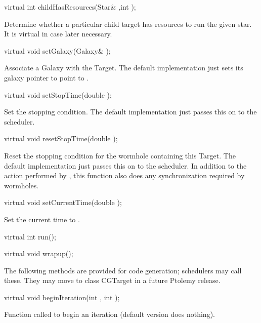 \begin{example}
virtual int childHasResources(Star& ,int );
\end{example}

Determine whether a particular child target has resources
to run the given star.  It is virtual in case later necessary.

\begin{example}
virtual void setGalaxy(Galaxy& );
\end{example}

Associate a Galaxy with the Target.  The default implementation
just sets its galaxy pointer  to point to .

\begin{example}
virtual void setStopTime(double );
\end{example}

Set the stopping condition.  The default implementation just passes
this on to the scheduler.

\begin{example}
virtual void resetStopTime(double );
\end{example}

Reset the stopping condition for the wormhole containing this Target.
The default implementation just passes this on to the scheduler.  In
addition to the action performed by , this function
also does any synchronization required by wormholes.

\begin{example}
virtual void setCurrentTime(double );
\end{example}

Set the current time to .

\begin{example}
virtual int run();
\end{example}

\begin{example}
virtual void wrapup();
\end{example}

The following methods are provided for code generation; schedulers may
call these.  They may move to class CGTarget in a future Ptolemy release.

\begin{example}
virtual void beginIteration(int , int );
\end{example}

Function called to begin an iteration (default version
does nothing).

